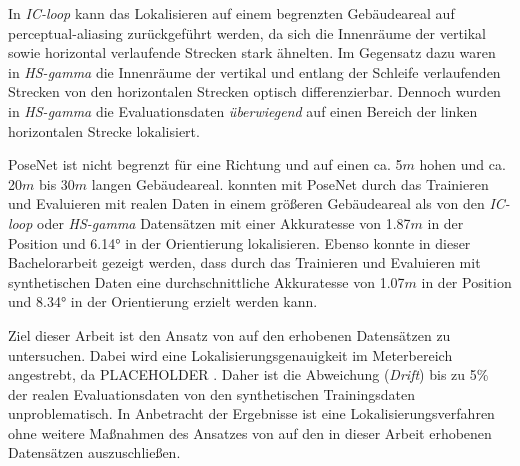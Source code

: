 In \textit{IC-loop} kann das Lokalisieren auf einem begrenzten Gebäudeareal auf perceptual-aliasing zurückgeführt werden, da sich die Innenräume der vertikal sowie horizontal verlaufende Strecken stark ähnelten. Im Gegensatz dazu waren in \textit{HS-gamma} die Innenräume der vertikal und entlang der Schleife verlaufenden Strecken von den horizontalen Strecken optisch differenzierbar. Dennoch wurden in \textit{HS-gamma} die Evaluationsdaten \textit{überwiegend} auf einen Bereich der linken horizontalen Strecke lokalisiert. 



PoseNet ist nicht begrenzt für eine Richtung und auf einen ca. 5$m$ hohen und ca. 20$m$ bis 30$m$ langen Gebäudeareal. \citet{walchImageBasedLocalizationUsing2017} konnten mit PoseNet durch das Trainieren und Evaluieren mit realen Daten in einem größeren Gebäudeareal als von den \textit{IC-loop} oder \textit{HS-gamma} Datensätzen mit einer Akkuratesse von 1.87$m$ in der Position und 6.14° in der Orientierung lokalisieren. Ebenso konnte in dieser Bachelorarbeit gezeigt werden, dass durch das Trainieren und Evaluieren mit synthetischen Daten eine durchschnittliche Akkuratesse von 1.07$m$ in der Position und 8.34° in der Orientierung erzielt werden kann.











Ziel dieser Arbeit ist den Ansatz von \citet{acharyaBIMPoseNetIndoorCamera2019} auf den erhobenen Datensätzen zu untersuchen. Dabei wird eine Lokalisierungsgenauigkeit im Meterbereich angestrebt, da PLACEHOLDER . Daher ist die Abweichung (\textit{Drift}) bis zu 5\% der realen Evaluationsdaten von den synthetischen Trainingsdaten unproblematisch. In Anbetracht der Ergebnisse ist eine Lokalisierungsverfahren ohne weitere Maßnahmen des Ansatzes von \citet{acharyaBIMPoseNetIndoorCamera2019} auf den in dieser Arbeit erhobenen Datensätzen auszuschließen.


